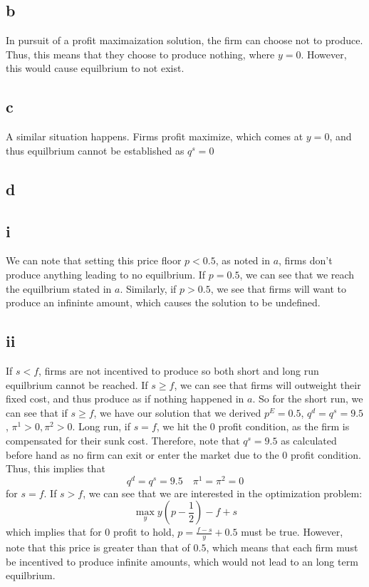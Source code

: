 \documentclass[11pt]{article}
\begin{document}
\subsection*{b}
In pursuit of a profit maximaization solution, the firm can choose not to produce. Thus, this means that they choose to produce nothing, where $y = 0$. However, this would cause equilbrium to not exist. 
\subsection*{c}
A similar situation happens. Firms profit maximize, which comes at $y = 0$, and thus equilbrium cannot be established as $q^s = 0$ 
\subsection*{d}
\subsection*{i}
We can note that setting this price floor $p < 0.5$, as noted in $a$, firms don't produce anything leading to no equilbrium. If $p = 0.5$, we can see that we reach the equilbrium stated in $a$. Similarly, if $p > 0.5$, we see that firms will want to produce an infininte amount, which causes the solution to be undefined.
\subsection*{ii}
If $s <f$, firms are not incentived to produce so both short and long run equilbrium cannot be reached. If $s \geq f$, we can see that firms will outweight their fixed cost, and thus produce as if nothing happened in $a$. So for the short run, we can see that if $s \geq f$, we have our solution that we derived $p^E = 0.5$, $q^d = q^s = 9.5$, $\pi^1 > 0, \pi^2 > 0$. Long run, if $s = f$, we hit the 0 profit condition, as the firm is compensated for their sunk cost. Therefore, note that $q^s = 9.5$ as calculated before hand as no firm can exit or enter the market due to the 0 profit condition. Thus, this implies that 
\[
q^d = q^s = 9.5 \quad \pi^1 = \pi^2 = 0
\] 
for $s = f$. If $s > f$, we can see that we are interested in the optimization problem:
\[
\max_y y(p-\frac{1}{2}) - f + s
\]
which implies that for 0 profit to hold, $p = \frac{f-s}{y} + 0.5$ must be true. However, note that this price is greater than that of $0.5$, which means that each firm must be incentived to produce infinite amounts, which would not lead to an long term equilbrium. 
\end{document}
